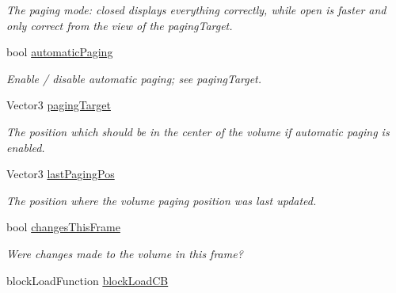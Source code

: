 \begin{DoxyCompactItemize}
\begin{DoxyCompactList}\small\item\em \-The paging mode\-: closed displays everything correctly, while open is faster and only correct from the view of the paging\-Target. \end{DoxyCompactList}\item 
\hypertarget{classVoxelVolume_af1e97976181edd66793174024597702f}{
bool \hyperlink{classVoxelVolume_af1e97976181edd66793174024597702f}{automatic\-Paging}}
\label{d0/d1c/classVoxelVolume_af1e97976181edd66793174024597702f}

\begin{DoxyCompactList}\small\item\em \-Enable / disable automatic paging; see paging\-Target. \end{DoxyCompactList}\item 
\hypertarget{classVoxelVolume_a89da3f7314e1e8ba0d36e809fc6ec291}{
\-Vector3 \hyperlink{classVoxelVolume_a89da3f7314e1e8ba0d36e809fc6ec291}{paging\-Target}}
\label{d0/d1c/classVoxelVolume_a89da3f7314e1e8ba0d36e809fc6ec291}

\begin{DoxyCompactList}\small\item\em \-The position which should be in the center of the volume if automatic paging is enabled. \end{DoxyCompactList}\item 
\hypertarget{classVoxelVolume_aa12113b36d399585df80b783b91b3929}{
\-Vector3 \hyperlink{classVoxelVolume_aa12113b36d399585df80b783b91b3929}{last\-Paging\-Pos}}
\label{d0/d1c/classVoxelVolume_aa12113b36d399585df80b783b91b3929}

\begin{DoxyCompactList}\small\item\em \-The position where the volume paging position was last updated. \end{DoxyCompactList}\item 
\hypertarget{classVoxelVolume_aef355d6dc18bf2cf8003e0c8a7dc529e}{
bool \hyperlink{classVoxelVolume_aef355d6dc18bf2cf8003e0c8a7dc529e}{changes\-This\-Frame}}
\label{d0/d1c/classVoxelVolume_aef355d6dc18bf2cf8003e0c8a7dc529e}

\begin{DoxyCompactList}\small\item\em \-Were changes made to the volume in this frame? \end{DoxyCompactList}\item 
\hypertarget{classVoxelVolume_af46d1901eca5ba4f74c0a04bf098d065}{
block\-Load\-Function \hyperlink{classVoxelVolume_af46d1901eca5ba4f74c0a04bf098d065}{block\-Load\-C\-B}}
\label{d0/d1c/classVoxelVolume_af46d1901eca5ba4f74c0a04bf098d065}


\end{DoxyCompactItemize}
